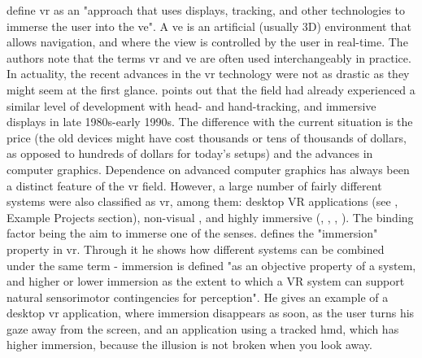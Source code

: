 \cite{jr_3d_2017} define \gls{vr} as an "approach that uses displays, tracking, and other technologies to immerse the user into the \gls{ve}". A \gls{ve} is an artificial (usually 3D) environment that allows navigation, and where the view is controlled by the user in real-time. The authors note that the terms \gls{vr} and \gls{ve} are often used interchangeably in practice. 
In actuality, the recent advances in the \gls{vr} technology were not as drastic as they might seem at the first glance. \cite{slater_immersion_2018} points out that the field had already experienced a similar level of development with head- and hand-tracking, and immersive displays in late 1980s-early 1990s. The difference with the current situation is the price (the old devices might have cost thousands or tens of thousands of dollars, as opposed to hundreds of dollars for today's setups) and the advances in computer graphics.
Dependence on advanced computer graphics has always been a distinct feature of the \gls{vr} field. However, a large number of fairly different systems were also classified as \gls{vr}, among them: desktop VR applications (see \cite{churchill_collaborative_1998}, Example Projects section), non-visual \cite{ammi_intermodal_2015}, and highly immersive (\cite{davidson_greenspace_1996}, \cite{greenwald_cocoverse_nodate}, \cite{lena_real-time_nodate}, \cite{kulik_virtual_2018}). The binding factor being the aim to immerse one of the senses. \cite{slater_immersion_2018} defines the "immersion" property in \gls{vr}. Through it he shows how different systems can be combined under the same term - immersion is defined "as an objective property of a system, and higher or lower immersion as the extent to which a VR system can support natural sensorimotor contingencies for perception". He gives an example of a desktop \gls{vr} application, where immersion disappears as soon, as the user turns his gaze away from the screen, and an application using a tracked \gls{hmd}, which has higher immersion, because the illusion is not broken when you look away.



